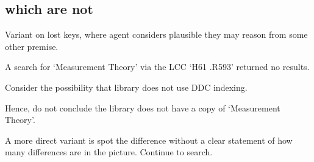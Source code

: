 \subsection{ which are not }
\label{cha:zS:sec:question:illu:basic:does-not-have}

\begin{note}
  Variant on lost keys, where agent considers plausible they may reason from some other premise.
  {
    \color{red}
    \begin{illustration}
      A search for `Measurement Theory' via the LCC `H61 .R593' returned no results.

      Consider the possibility that library does not use DDC indexing.

      Hence, do not conclude the library does not have a copy of `Measurement Theory'.
    \end{illustration}
  }

  A more direct variant is spot the difference without a clear statement of how many differences are in the picture.
  Continue to search.
\end{note}

